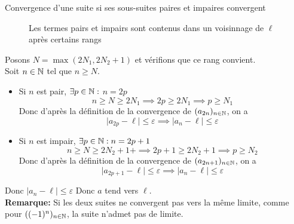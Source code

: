 \documentclass{article}
\renewenvironment{question_kholle}[2][ ]
{
	\subsection{\texorpdfstring{#2}{}}
	\notblank{#1}
	{
		\noindent #1
		\bigbreak
	}
	{}
	\begin{proof}
}
{
	\end{proof}
}
\begin{document}
\begin{question_kholle}{Convergence d'une suite si ses sous-suites
		paires et impaires convergent}
\begin{figure}[H]
		\caption{Les termes pairs et impairs sont contenus dans un
			voisinnage de $\ell$ après certains rangs}
	\end{figure}

	\noindent Posons $N = \max(2N_{1}, 2N_{2}+1)$ et vérifions que ce
	rang convient. \\
	Soit $n \in \mathbb N$ tel que $n \geqslant N$.
	\begin{itemize}[label=$\star$]
		\item Si $n$ est pair, $\exists p \in \mathbb N :$ $n = 2p$
		      $$
			      n\geqslant N \geqslant 2N_{1} \implies 2p \geqslant 2N_{1}
			      \implies p \geqslant N_{1}
		      $$
		      Donc d'après la définition de la convergence de $(a_{2n})_{n
					      \in \mathbb N}$, on a
		      $$
			      \lvert a_{2p} - \ell \rvert  \leqslant \varepsilon \implies
			      \lvert a_{n} - \ell  \rvert  \leqslant \varepsilon
		      $$

		\item Si $n$ est impair, $\exists p \in \mathbb N : n = 2p +1$
		      $$
			      n \geqslant N \geqslant 2N_{2}+1 +\implies 2p+1 \geqslant
			      2N_{2} + 1 \implies p \geqslant N_{2}
		      $$
		      Donc d'après la définition de la convergence de $(a_{2n+1})_{n
					      \in \mathbb N}$, on a
		      $$
			      \lvert a_{2p+1} - \ell\rvert  \leqslant \varepsilon \implies
			      \lvert a_{n} - \ell \rvert \leqslant \varepsilon
		      $$
	\end{itemize}
	Donc $\lvert a_{n} - \ell  \rvert\leqslant \varepsilon$
	Donc $a$ tend vers $\ell$.\\[4pt]
	\textbf{Remarque:} Si les deux suites ne convergent pas vers la
	même limite, comme pour $((-1)^{n})_{n \in \mathbb N}$, la suite n'admet
	pas de limite.
\end{question_kholle}
\end{document}

